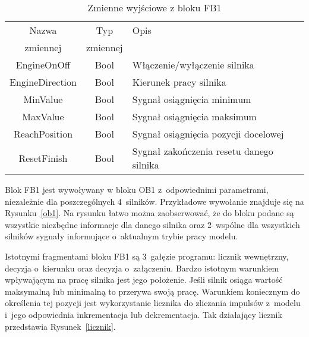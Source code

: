 \begin{table}[!htb]
\begin{center}
\begin{tabular}{|c|c| p{10cm} |}\hline
Nazwa & Typ & Opis  \\
zmiennej &  zmiennej &   \\\hline
EngineOnOff & Bool & Włączenie/wyłączenie                             silnika \\\hline   
EngineDirection & Bool & Kierunek pracy silnika \\\hline   
MinValue & Bool & Sygnał osiągnięcia                           minimum \\\hline   
MaxValue & Bool & Sygnał osiągnięcia                           maksimum \\\hline   
ReachPosition & Bool & Sygnał osiągnięcia                                pozycji docelowej \\\hline   
ResetFinish & Bool & Sygnał zakończenia                                resetu danego silnika \\\hline   
\end{tabular}
\end{center}
\vspace*{-6mm}
  \caption{Zmienne wyjściowe z bloku FB1}
	\label{fb1dataout}
\end{table}

Blok FB1 jest wywoływany w bloku OB1 z~odpowiednimi parametrami, niezależnie dla poszczególnych 4~silników. Przykładowe wywołanie znajduje się na Rysunku~\ref{ob1}. Na rysunku łatwo można zaobserwować, że do bloku podane są wszystkie niezbędne informacje dla danego silnika oraz 2~wspólne dla wszystkich silników sygnały informujące o~aktualnym trybie pracy modelu.

Istotnymi fragmentami bloku FB1 są 3~gałęzie programu: licznik wewnętrzny, decyzja o~kierunku oraz decyzja o~załączeniu.
Bardzo istotnym warunkiem wpływającym na pracę silnika jest jego położenie. Jeśli silnik osiąga wartość maksymalną lub minimalną to przerywa swoją pracę. Warunkiem koniecznym do określenia tej pozycji jest wykorzystanie licznika do zliczania impulsów z~modelu i~jego odpowiednia inkrementacja lub dekrementacja. Tak działający licznik przedstawia Rysunek~\ref{licznik}.

